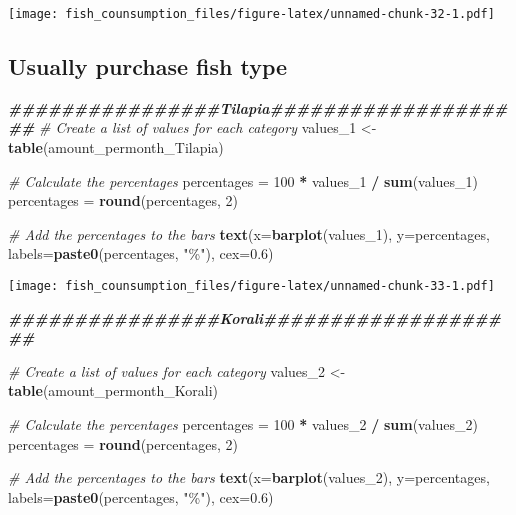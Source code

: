 \documentclass[
]{article}
\newenvironment{Shaded}{\begin{snugshade}}{\end{snugshade}}
\newcommand{\AttributeTok}[1]{\textcolor[rgb]{0.13,0.29,0.53}{#1}}
\newcommand{\CommentTok}[1]{\textcolor[rgb]{0.56,0.35,0.01}{\textit{#1}}}
\newcommand{\DecValTok}[1]{\textcolor[rgb]{0.00,0.00,0.81}{#1}}
\newcommand{\DocumentationTok}[1]{\textcolor[rgb]{0.56,0.35,0.01}{\textbf{\textit{#1}}}}
\newcommand{\FloatTok}[1]{\textcolor[rgb]{0.00,0.00,0.81}{#1}}
\newcommand{\FunctionTok}[1]{\textcolor[rgb]{0.13,0.29,0.53}{\textbf{#1}}}
\newcommand{\NormalTok}[1]{#1}
\newcommand{\OtherTok}[1]{\textcolor[rgb]{0.56,0.35,0.01}{#1}}
\newcommand{\SpecialCharTok}[1]{\textcolor[rgb]{0.81,0.36,0.00}{\textbf{#1}}}
\newcommand{\StringTok}[1]{\textcolor[rgb]{0.31,0.60,0.02}{#1}}
\begin{document}
\texttt{[image: fish\_counsumption\_files/figure-latex/unnamed-chunk-32-1.pdf]}

\hypertarget{usually-purchase-fish-type}{%
\subsection{Usually purchase fish
type}\label{usually-purchase-fish-type}}

\begin{Shaded}
\begin{Highlighting}[]
\DocumentationTok{\#\#\#\#\#\#\#\#\#\#\#\#\#\#\#\#Tilapia\#\#\#\#\#\#\#\#\#\#\#\#\#\#\#\#\#\#\#\#}
\CommentTok{\# Create a list of values for each category}
\NormalTok{values\_1 }\OtherTok{\textless{}{-}} \FunctionTok{table}\NormalTok{(amount\_permonth\_Tilapia)}

\CommentTok{\# Calculate the percentages}
\NormalTok{percentages }\OtherTok{=} \DecValTok{100} \SpecialCharTok{*}\NormalTok{ values\_1 }\SpecialCharTok{/} \FunctionTok{sum}\NormalTok{(values\_1)}
\NormalTok{percentages }\OtherTok{=} \FunctionTok{round}\NormalTok{(percentages, }\DecValTok{2}\NormalTok{)}

\CommentTok{\# Add the percentages to the bars}
\FunctionTok{text}\NormalTok{(}\AttributeTok{x=}\FunctionTok{barplot}\NormalTok{(values\_1), }\AttributeTok{y=}\NormalTok{percentages, }\AttributeTok{labels=}\FunctionTok{paste0}\NormalTok{(percentages, }\StringTok{"\%"}\NormalTok{), }\AttributeTok{cex=}\FloatTok{0.6}\NormalTok{)}
\end{Highlighting}
\end{Shaded}

\texttt{[image: fish\_counsumption\_files/figure-latex/unnamed-chunk-33-1.pdf]}

\begin{Shaded}
\begin{Highlighting}[]
\DocumentationTok{\#\#\#\#\#\#\#\#\#\#\#\#\#\#\#\#Korali\#\#\#\#\#\#\#\#\#\#\#\#\#\#\#\#\#\#\#\#}

\CommentTok{\# Create a list of values for each category}
\NormalTok{values\_2 }\OtherTok{\textless{}{-}} \FunctionTok{table}\NormalTok{(amount\_permonth\_Korali)}

\CommentTok{\# Calculate the percentages}
\NormalTok{percentages }\OtherTok{=} \DecValTok{100} \SpecialCharTok{*}\NormalTok{ values\_2 }\SpecialCharTok{/} \FunctionTok{sum}\NormalTok{(values\_2)}
\NormalTok{percentages }\OtherTok{=} \FunctionTok{round}\NormalTok{(percentages, }\DecValTok{2}\NormalTok{)}

\CommentTok{\# Add the percentages to the bars}
\FunctionTok{text}\NormalTok{(}\AttributeTok{x=}\FunctionTok{barplot}\NormalTok{(values\_2), }\AttributeTok{y=}\NormalTok{percentages, }\AttributeTok{labels=}\FunctionTok{paste0}\NormalTok{(percentages, }\StringTok{"\%"}\NormalTok{), }\AttributeTok{cex=}\FloatTok{0.6}\NormalTok{)}
\end{Highlighting}
\end{Shaded}
\end{document}
